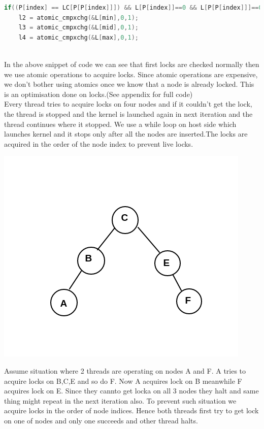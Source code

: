 \documentclass[BTech]{iitmdiss}
\begin{document}
\lstset{style=mystyle}
\begin{lstlisting}[language=C]
if((P[index] == LC[P[P[index]]]) && L[P[index]]==0 && L[P[P[index]]]==0 && L[RC[P[P[index]]]]==0){
    l2 = atomic_cmpxchg(&L[min],0,1); 
    l3 = atomic_cmpxchg(&L[mid],0,1);
    l4 = atomic_cmpxchg(&L[max],0,1);
\end{lstlisting}\\
In the above snippet of code we can see that first locks are checked normally then we use atomic operations to acquire locks. Since atomic operations are expensive, we don't bother using atomics once we know that a node is already locked. This is an optimisation done on locks.(See appendix for full code)\\
Every thread tries to acquire locks on four nodes and if it couldn't get the lock, the thread is stopped and the kernel is launched again in next iteration and the thread continues where it stopped. We use a while loop on host side which launches kernel and it stops only after all the nodes are inserted.The locks are acquired in the order of the node index to prevent live locks.\\
\centerline{\includegraphics{img2.png}}
Assume situation where 2 threads are operating on nodes A and F. A tries to acquire locks on B,C,E and so do F. Now A acquires lock on B meanwhile F acquires lock on E. Since they cannto get locka on all 3 nodes they halt and same thing might repeat in the next iteration also. To prevent such situation we acquire locks in the order of node indices. Hence both threads first try to get lock on one of nodes and only one succeeds and other thread halts.
\end{document}
